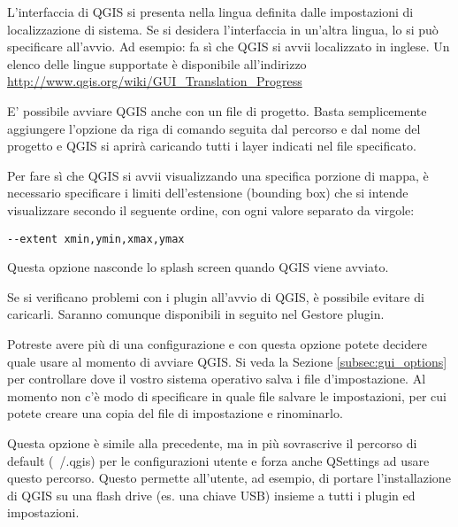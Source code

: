 L'interfaccia di QGIS si presenta nella lingua definita dalle impostazioni di localizzazione di sistema.
Se si desidera l'interfaccia in un'altra lingua, lo si può specificare all'avvio. Ad esempio:
fa sì che QGIS si avvii localizzato in inglese.
Un elenco delle lingue supportate è disponibile all'indirizzo
\url{http://www.qgis.org/wiki/GUI_Translation_Progress} 

E' possibile avviare QGIS anche con un file di progetto. Basta semplicemente
aggiungere l'opzione da riga di comando  seguita dal percorso e dal nome
del progetto e QGIS si aprirà caricando tutti i layer indicati nel file specificato.

Per fare sì che QGIS si avvii visualizzando una specifica porzione di mappa, è necessario specificare 
i limiti dell'estensione (bounding box) che si intende visualizzare secondo il seguente ordine, con ogni 
valore separato da virgole:
\begin{verbatim}
--extent xmin,ymin,xmax,ymax
\end{verbatim}

Questa opzione nasconde lo splash screen quando QGIS viene avviato.

Se si verificano problemi con i plugin all'avvio di QGIS, è possibile evitare di caricarli. Saranno comunque disponibili in seguito nel Gestore plugin.

Potreste avere più di una configurazione e con questa opzione potete decidere quale usare al momento di avviare QGIS. 
Si veda la Sezione \ref{subsec:gui_options} per controllare dove il vostro sistema operativo salva i file d'impostazione. Al momento non c'è modo di specificare in quale file salvare le impostazioni, per cui potete creare una copia del file di impostazione e rinominarlo.

Questa opzione è simile alla precedente, ma in più sovrascrive il percorso di default (~/.qgis) per le configurazioni utente e forza anche QSettings ad usare questo percorso. Questo permette all'utente, ad esempio, di portare l'installazione di QGIS su una flash drive (es. una chiave USB) insieme a tutti i plugin ed impostazioni.

